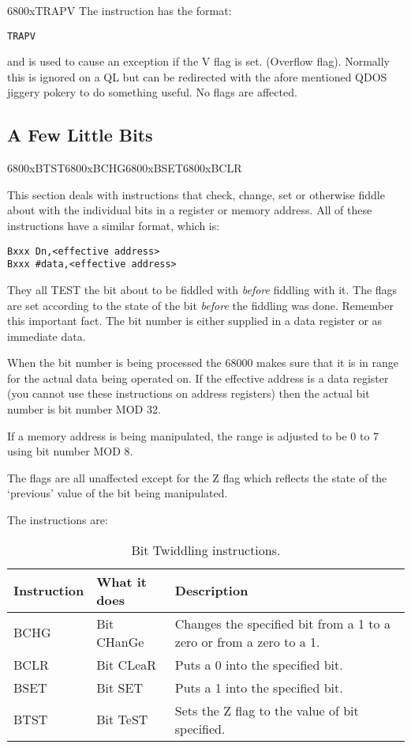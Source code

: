\mc6800x{TRAPV}
The  instruction has the format:

\begin{lstlisting}[firstnumber=1,]
          TRAPV
\end{lstlisting}

and is used to cause an exception if the V flag is set. (Overflow
      flag). Normally this is ignored on a QL but can be redirected with the
      afore mentioned QDOS jiggery pokery to do something useful. No flags are
      affected.

\subsection{A Few Little Bits}\mc6800x{BTST}\mc6800x{BCHG}\mc6800x{BSET}\mc6800x{BCLR}
\label{ch5-bits}%

This section deals with instructions that check, change, set or
      otherwise fiddle about with the individual bits in a register or memory
      address. All of these instructions have a similar format, which is:

\begin{lstlisting}[firstnumber=1,frame=none,numbers=none]
Bxxx Dn,<effective address>
Bxxx #data,<effective address>
\end{lstlisting}

They all TEST the bit about to be fiddled with \emph{before} fiddling
      with it. The flags are set according to the state of the bit \emph{before} the
      fiddling was done. Remember this important fact. The bit number is
      either supplied in a data register or as immediate data.

When the bit number is being processed the 68000 makes sure that
      it is in range for the actual data being operated on. If the effective
      address is a data register (you cannot use these instructions on address
      registers) then the actual bit number is bit number MOD 32.

If a memory address is being manipulated, the range is adjusted to
      be 0 to 7 using bit number MOD 8.

The flags are all unaffected except for the Z flag which reflects the
      state of the `previous' value of the bit being manipulated.

The instructions are:

\begin{table}[htbp]
\centering
\begin{tabular}{l l l}
\toprule
\textbf{Instruction} & \textbf{What it does} &  \textbf{Description}\\
\midrule
BCHG & Bit CHanGe & Changes the specified bit from a 1 to a zero or from a zero to a 1. \\
BCLR & Bit CLeaR & Puts a 0 into the specified bit.\\
BSET & Bit SET  & Puts a 1 into the specified bit.\\
BTST & Bit TeST & Sets the Z flag to the value of bit specified.\\
\bottomrule
\end{tabular}
\caption{Bit Twiddling instructions.}
\label{tab:BitTwiddlingInstructions}
\end{table}


